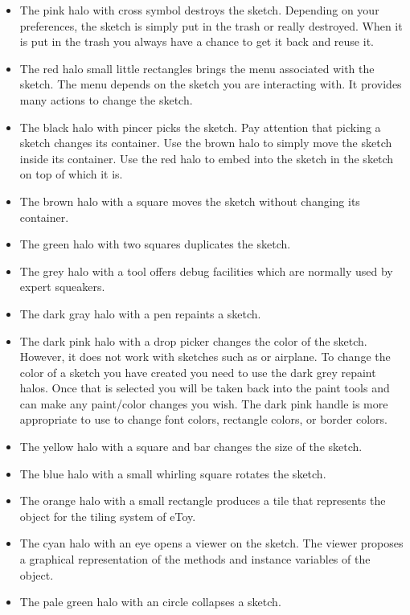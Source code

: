 \begin{itemize}
\item The pink halo with cross symbol destroys the sketch. Depending on your preferences, the sketch is simply put in the trash or really destroyed. When it is put in the trash you always have a chance to get it back and reuse it. 

\item The red halo small little rectangles brings the menu associated with the sketch. The menu depends on the sketch you are interacting with. It provides many actions to change the sketch.

\item The black halo with pincer picks the sketch. Pay attention that picking a sketch changes its container. Use the brown halo to simply move the sketch inside its container. Use the red halo to embed into the sketch in the sketch on top of which it is. 

\item The brown halo with a square moves the sketch without changing its container. 

\item The green halo with two squares duplicates the sketch. 

\item The grey halo with a tool offers debug facilities which are normally used by expert squeakers. 

\item The dark gray halo with a pen repaints a sketch. 

\item The dark pink halo with a drop picker changes the color of the sketch. However, it does not work with sketches such as or airplane.   To change the color of a sketch you have created you need to use the dark grey repaint halos.  Once that is selected you
will be taken back into the paint tools and can make any paint/color
changes you wish.  The dark pink handle is more appropriate to use to
change font colors, rectangle colors, or border colors. 

\item The yellow halo with a square and bar changes the size of the sketch.

\item The blue halo with a small whirling square  rotates the sketch.
\item The orange halo with a small rectangle produces a tile that represents the object for the tiling system of eToy.

\item The cyan halo with an eye  opens a viewer on the sketch. The viewer proposes a graphical representation of the 
methods and instance variables of the object. 
\item The pale green halo with an circle collapses a sketch.

\end{itemize}


